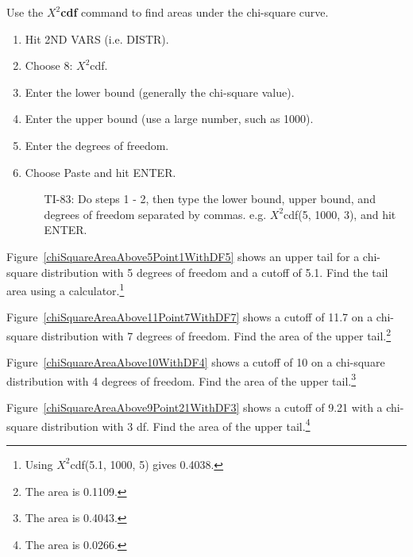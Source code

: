 \begin{termBox}{
Use the \textbf{$X^2$cdf} command to find areas under the chi-square curve.
\begin{enumerate}
\setlength{\itemsep}{0mm}
\item Hit 2ND VARS (i.e. DISTR).
\item Choose 8: $X^2$cdf.
\item Enter the lower bound (generally the chi-square value).
\item Enter the upper bound (use a large number, such as 1000).
\item Enter the degrees of freedom.
\item Choose Paste and hit ENTER.
\begin{itemize}
\item[TI-83: ] Do steps 1 - 2, then type the lower bound, upper bound, and degrees of freedom separated by commas. e.g. $X^2$cdf(5, 1000, 3), and hit ENTER.
\end{itemize}
\end{enumerate}
}
\end{termBox}

\begin{exercise}
Figure~\ref{chiSquareAreaAbove5Point1WithDF5} shows an upper tail for a chi-square distribution with 5 degrees of freedom and a cutoff of 5.1. Find the tail area using a calculator.\footnote{Using $X^2$cdf(5.1, 1000, 5) gives 0.4038.}
\end{exercise}

\begin{exercise}
Figure~\ref{chiSquareAreaAbove11Point7WithDF7} shows a cutoff of 11.7 on a chi-square distribution with 7 degrees of freedom. Find the area of the upper tail.\footnote{The area is 0.1109.}
\end{exercise}

\begin{exercise}
Figure~\ref{chiSquareAreaAbove10WithDF4} shows a cutoff of 10 on a chi-square distribution with 4 degrees of freedom. Find the area of the upper tail.\footnote{The area is 0.4043.}
\end{exercise}

\begin{exercise}
Figure~\ref{chiSquareAreaAbove9Point21WithDF3} shows a cutoff of 9.21 with a chi-square distribution with 3 df. Find the area of the upper tail.\footnote{The area is 0.0266.}
\end{exercise}


